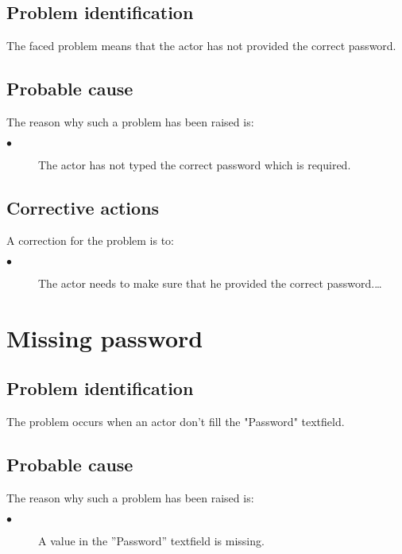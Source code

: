 \subsection{Problem identification}
The faced problem means that the actor has not provided the correct password.

\subsection{Probable cause}

The reason why such a problem has been raised is:\\
\begin{description}
\item[$\bullet$] The actor has not typed the correct password which is
required.
\end{description}


\subsection{Corrective actions}

A correction for the problem is to:\\
\begin{description}
\item[$\bullet$] The actor needs to make sure that he provided the correct
password.\ldots

\end{description}



\section{Missing password} 

\subsection{Problem identification}
The problem occurs when an actor don't fill the "Password" textfield.

\subsection{Probable cause}

The reason why such a problem has been raised is:\\
\begin{description}
\item[$\bullet$] A value in the ''Password'' textfield is missing.
\end{description}


